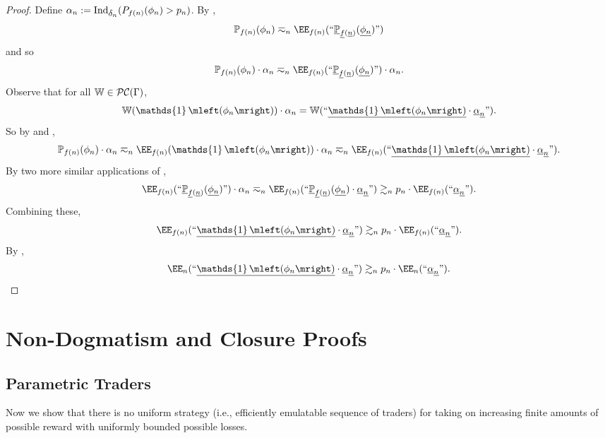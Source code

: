 \documentclass[authordate,onecolumn,noenvironments]{miri-tech-article}
\numberwithin{equation}{subsection}
\newcommand{\quot}[1]{``#1"}
\newcommand{\enc}[1]{{\underline{#1}}}
\newcommand{\BelState}{\mathbb{P}}
\newcommand{\pt}{\BelState}
\newcommand{\cworlds}{\mathcal{P\-C}} %
\newcommand{\World}{\mathbb{W}}
\newcommand{\Theory}{\Gamma}
\DeclareMathOperator{\OneOperator}{\mathds{1}}
\newcommand{\ctsind}[1]{\operatorname{Ind}_{\text{\small{${#1}$}}}} %
\newcommand{\sentind}[1]{\OneOperator\mleft(#1\mright)}
\begin{document}
\begin{proof}
  Define  $\alpha_n := \ctsind{\delta_n}(P_{f(n)}(\phi_n) > p_n)$.
  By ,
  \[ \pt_{f(n)}(\phi_n) 
     \eqsim_n 
     \EE_{f(n)}(\quot{ \enc{\pt}_{\enc{f}(\enc{n}) } (\enc{\phi_n})} )
   \]
   and so
  \[ \pt_{f(n)}(\phi_n) \cdot \alpha_n
     \eqsim_n 
     \EE_{f(n)}(\quot{ \enc{\pt}_{\enc{f}(\enc{n}) } (\enc{\phi_n})} ) \cdot \alpha_n.
   \]
   Observe that for all $\World \in \cworlds(\Theory)$,
   \[
   \World(\sentind{\phi_n}) \cdot \alpha_n
   =
  \World(\quot{ \enc{\sentind{\phi_n}} \cdot \enc{\alpha}_{ \enc{n}} }).
  \]
   So by  and ,
  \[
    \pt_{f(n)}(\phi_n) \cdot \alpha_n \eqsim_n \EE_{f(n)}(\sentind{\phi_n}) \cdot \alpha_n
  \eqsim_n
  \EE_{f(n)}(\quot{ \enc{\sentind{\phi_n}} \cdot \enc{\alpha}_{ \enc{n}} }).
  \]
  By two more similar applications of ,
  \[ 
     \EE_{f(n)}(\quot{ \enc{\pt}_{\enc{f}(\enc{n}) } (\enc{\phi_n})} ) \cdot \alpha_n
     \eqsim_n
     \EE_{f(n)}(\quot{ \enc{\pt}_{\enc{f}(\enc{n}) } (\enc{\phi_n}) \cdot \enc{\alpha}_{\enc{n}}} )
     \gtrsim_n
     p_n \cdot \EE_{f(n)}(\quot{\enc{\alpha}_{\enc{n}}}).
   \]
   Combining these,
   \[
     \EE_{f(n)}(\quot{ \enc{\sentind{\phi_n}} \cdot \enc{\alpha}_{ \enc{n}} })
    \gtrsim_n
     p_n \cdot \EE_{f(n)}(\quot{\enc{\alpha}_{\enc{n}}}).
   \]
   By ,
   \[
     \EE_n(\quot{ \enc{\sentind{\phi_n}} \cdot \enc{\alpha}_{ \enc{n}} })
    \gtrsim_n
     p_n \cdot \EE_n(\quot{\enc{\alpha}_{\enc{n}}}).
   \]

\end{proof}


\section{Non-Dogmatism and Closure Proofs}\label{app:nondogproofs}


\subsection{Parametric Traders}\label{app:parametric}



Now we show that  there is no uniform strategy (i.e., efficiently emulatable sequence of traders) for taking on increasing finite amounts of possible reward with uniformly bounded possible losses.

\end{document}

